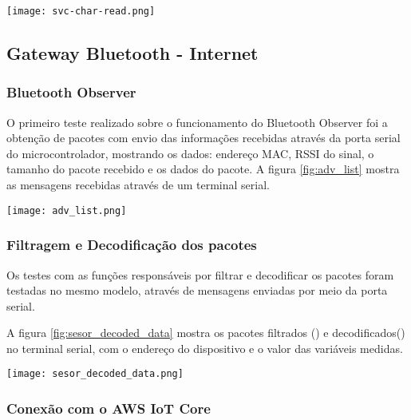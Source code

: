 \begin{center}
	\centering 
	\texttt{[image: svc-char-read.png]}
	\label{fig:svc-char-read}
\end{center} 

\subsection{Gateway Bluetooth - Internet}

\subsubsection{Bluetooth Observer}
 
O primeiro teste realizado sobre o funcionamento do Bluetooth Observer foi a
obtenção de pacotes com envio das informações recebidas através da porta serial
do microcontrolador, mostrando os dados: endereço MAC, RSSI do sinal, o tamanho
do pacote recebido e os dados do pacote. A figura \ref{fig:adv_list} mostra as
mensagens recebidas através de um terminal serial.

\begin{center}
	\centering 
	\texttt{[image: adv\_list.png]}
	\label{fig:adv_list}
\end{center} 

\subsubsection{Filtragem e Decodificação dos pacotes}
Os testes com as funções responsáveis por filtrar e decodificar os pacotes foram
testadas no mesmo modelo, através de mensagens enviadas por meio da porta
serial.

A figura \ref{fig:sesor_decoded_data} mostra os pacotes filtrados
() e decodificados() no
terminal serial, com o endereço do dispositivo e o valor das variáveis medidas.

\begin{center}
	\centering 
	\texttt{[image: sesor\_decoded\_data.png]}
	\label{fig:sesor_decoded_data}
\end{center} 


\subsubsection{Conexão com o AWS IoT Core}

